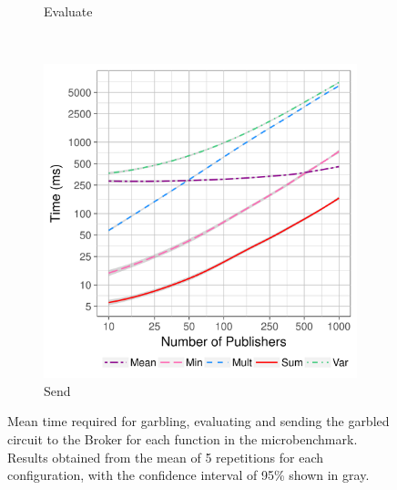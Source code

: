 \begin{figure}
\begin{subfigure}[b]{0.32\textwidth}
        \caption{Evaluate}
        \label{fig:micro-eval-time}
    \end{subfigure}
    ~ %
    \begin{subfigure}[b]{0.32\textwidth}
        \includegraphics[width=\textwidth]{plots/send_loglog.png}
        \caption{Send}
        \label{fig:micro-send-time}
    \end{subfigure}
    \caption{Mean time required for garbling, evaluating and sending the
      garbled circuit to the Broker for each function in the microbenchmark.
      Results obtained from the mean of 5 repetitions for each configuration,
      with the confidence interval of 95\% shown in gray.}
    \label{fig:micro-times}
\end{figure}

